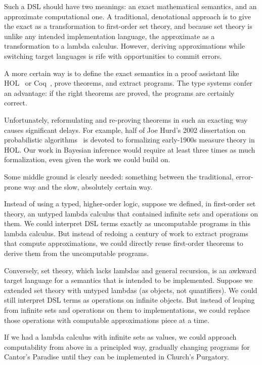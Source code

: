 Such a DSL should have two meanings: an exact mathematical semantics, and an approximate computational one. A traditional, denotational approach is to give the exact as a transformation to first-order set theory, and because set theory is unlike any intended implementation language, the approximate as a transformation to a lambda calculus. However, deriving approximations while switching target languages is rife with opportunities to commit errors.

A more certain way is to define the exact semantics in a proof assistant like HOL~\cite{leivant-1994-hol} or Coq~\cite{cit:book-coqart}, prove theorems, and extract programs. The type systems confer an advantage: if the right theorems are proved, the programs are certainly correct.

Unfortunately, reformulating and re-proving theorems in such an exacting way causes significant delays. For example, half of Joe Hurd's 2002 dissertation on probabilistic algorithms~\cite{cit:hurd-2002thesis} is devoted to formalizing early-1900s measure theory in HOL. Our work in Bayesian inference would require at least three times as much formalization, even given the work we could build on.

Some middle ground is clearly needed: something between the traditional, error-prone way and the slow, absolutely certain way.

Instead of using a typed, higher-order logic, suppose we defined, in first-order set theory, an untyped lambda calculus that contained infinite sets and operations on them. We could interpret DSL terms exactly as uncomputable programs in this lambda calculus. But instead of redoing a century of work to extract programs that compute approximations, we could directly reuse first-order theorems to derive them from the uncomputable programs.

Conversely, set theory, which lacks lambdas and general recursion, is an awkward target language for a semantics that is intended to be implemented. Suppose we extended set theory with untyped lambdas (as objects, not quantifiers). We could still interpret DSL terms as operations on infinite objects. But instead of leaping from infinite sets and operations on them to implementations, we could replace those operations with computable approximations piece at a time.

If we had a lambda calculus with infinite sets as values, we could approach computability from above in a principled way, gradually changing programs for Cantor's Paradise until they can be implemented in Church's Purgatory.

